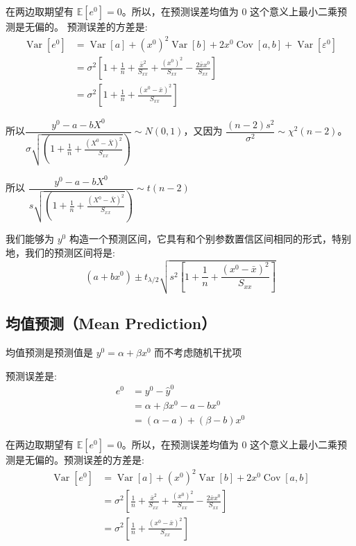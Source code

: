 在两边取期望有 $ \mathbb{E}[e^{0}] = 0 $。所以，在预测误差均值为 0 这个意义上最小二乘预测是无偏的。
预测误差的方差是:
$$ \begin{aligned}
    \operatorname{Var}\left[e^{0}\right] &=\operatorname{Var}[a]+\left(x^{0}\right)^{2} \operatorname{Var}[b]+2 x^{0} \operatorname{Cov}[a, b]+\operatorname{Var}\left[\varepsilon^{0}\right] \\
    &=\sigma^{2}\left[1+\frac{1}{n}+\frac{\bar{x}^{2}}{S_{x x}}+\frac{\left(x^{0}\right)^{2}}{S_{x x}}-\frac{2 \bar{x} x^{0}}{S_{x x}}\right] \\
    &=\sigma^{2}\left[1+\frac{1}{n}+\frac{\left(x^{0}-\bar{x}\right)^{2}}{S_{x x}}\right]
\end{aligned} $$

所以$\dfrac{y^{0}-a-b X^{0}}{\left.\sigma \sqrt{\left(1+\frac{1}{n}+\frac{\left(X^{0}-\bar{X}\right)^{2}}{S_{x x}}\right.}\right)} \sim N(0,1)$，又因为 
$ \dfrac{(n-2) s^{2}}{\sigma^{2}} \sim \chi^{2}(n-2) $。

所以 $ \dfrac{y^{0}-a-b X^{0}}{\left.s \sqrt{\left(1+\frac{1}{n}+\frac{\left(X^{0}-\bar{X}\right)^{2}}{S_{x x}}\right.}\right)} \sim t(n-2) $

我们能够为 $ y^{0} $ 构造一个预测区间，它具有和个别参数置信区间相同的形式，特别地，我们的预测区间将是:
\begin{equation}
    \left(a+b x^{0}\right) \pm t_{\lambda / 2} \sqrt{s^{2}\left[1+\frac{1}{n}+\frac{\left(x^{0}-\bar{x}\right)^{2}}{S_{x x}}\right]}
\end{equation}

\subsection{均值预测（Mean Prediction）}
均值预测是预测值是 $ y^{0}=\alpha+\beta x^{0} $ 而不考虑随机干扰项

预测误差是:
$$ \begin{aligned}
    e^{0}  &= y^{0}-\hat{y}^{0} \\
    &= \alpha+\beta x^{0}-a-b x^{0} \\
    &=(\alpha-a)+(\beta-b) x^{0}
\end{aligned} $$

在两边取期望有 $ \mathbb{E}[e^{0}]=0 $。所以，在预测误差均值为 0 这个意义上最小二乘预测是无偏的。预测误差的方差是:
\begin{align*}
    \operatorname{Var}\left[e^{0}\right] & = \operatorname{Var}[a]+\left(x^{0}\right)^{2} \operatorname{Var}[b]+2 x^{0} \operatorname{Cov}[a, b] \\ 
    & = \sigma^{2}\left[\frac{1}{n}+\frac{\bar{x}^{2}}{S_{x x}}+\frac{\left(x^{0}\right)^{2}}{S_{x x}}-\frac{2 \bar{x} x^{0}}{S_{x x}}\right] \\ 
    & = \sigma^{2}\left[\frac{1}{n}+\frac{\left(x^{0}-\bar{x}\right)^{2}}{S_{x x}}\right]
\end{align*}

